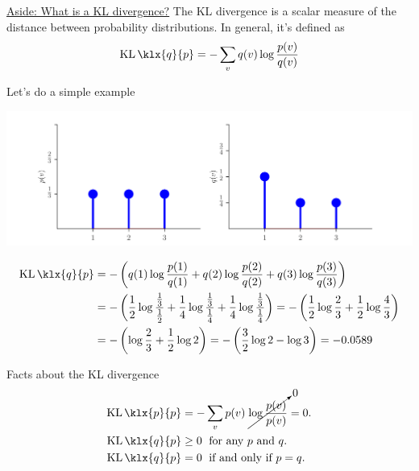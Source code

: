 \documentclass[11pt]{article}
\DeclareMathOperator{\KLsym}{KL}
\newcommand{\KL}{\KLsym\klx}
\begin{document}
\begin{framed}
  \underline{Aside: What is a KL divergence?} The KL divergence is a scalar measure
  of the distance between probability distributions. In general, it's defined
  as
  \begin{equation*}
    \KL{q}{p} = -\sum_{v} q(v) \log \frac{p(v)}{q(v)}
  \end{equation*}

  Let's do a simple example
  \begin{center}
    \includegraphics[scale=0.5]{KLexample.pdf}
  \end{center}
  \begin{align*}
    \KL{q}{p} &= -\left(q(1) \log \frac{p(1)}{q(1)} +
          q(2) \log \frac{p(2)}{q(2)} + q(3) \log \frac{p(3)}{q(3)} \right) \\
        &= -\left( \frac{1}{2} \log \frac{\frac{1}{3}}{\frac{1}{2}} +
          \frac{1}{4} \log \frac{\frac{1}{3}}{\frac{1}{4}} +
          \frac{1}{4} \log \frac{\frac{1}{3}}{\frac{1}{4}} \right)
        = -\left( \frac{1}{2} \log \frac{2}{3} +
            \frac{1}{2} \log \frac{4}{3} \right) \\
        &= -\left( \log \frac{2}{3} +
            \frac{1}{2} \log 2 \right)
        = -\left( \frac{3}{2} \log 2 - \log 3 \right) = -0.0589
  \end{align*}

  Facts about the KL divergence
  \vspace{-2\baselineskip}
  \begin{align*}
    \KL{p}{p} &= -\sum_{v} p(v) \; \cancelto{0}{\log \frac{p(v)}{p(v)}} = 0. \\
    \KL{q}{p} &\geq 0 \; \text{ for any $p$ and $q$}. \\
    \KL{q}{p} &= 0 \; \text{ if and only if $p = q$}.
  \end{align*}
\end{framed}
\end{document}
